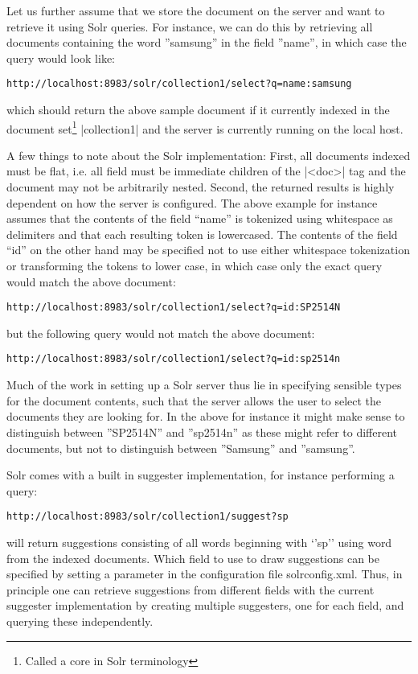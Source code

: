 Let us further assume that we store the document on the server and want to retrieve it using Solr queries. For instance, we can do this by retrieving all documents containing the word ''samsung'' in the field ''name'', in which case the query would look like:

\begin{verbatim}
http://localhost:8983/solr/collection1/select?q=name:samsung
\end{verbatim}

\noindent which should return the above sample document if it currently indexed in the document set\footnote{Called a core in Solr terminology} |collection1| and the server is currently running on the local host.

A few things to note about the Solr implementation: First, all documents indexed must be flat, i.e. all  field must be immediate children of the |<doc>| tag and the document may not be arbitrarily nested. Second, the returned results is highly dependent on how the server is configured. The above example for instance assumes that the contents of the field “name” is tokenized using whitespace as delimiters and that each resulting token is lowercased. The contents of the field “id” on the other hand may be specified not to use either whitespace tokenization or transforming the tokens to lower case, in which case only the exact query would match the above document:

\begin{verbatim}
http://localhost:8983/solr/collection1/select?q=id:SP2514N
\end{verbatim}

\noindent but the following query would not match the above document:

\begin{verbatim}
http://localhost:8983/solr/collection1/select?q=id:sp2514n
\end{verbatim}

Much of the work in setting up a Solr server thus lie in specifying sensible types for the document contents, such that the server allows the user to select the documents they are looking for. In the above for instance it might make sense to distinguish between ''SP2514N'' and ''sp2514n'' as these might refer to different documents, but not to distinguish between ''Samsung'' and ''samsung''.

Solr comes with a built in suggester implementation, for instance performing a query:

\begin{verbatim}
http://localhost:8983/solr/collection1/suggest?sp
\end{verbatim}

\noindent will return suggestions consisting of all words beginning with ‘’sp’’ using word from the indexed documents. Which field to use to draw suggestions can be specified by setting a parameter in the configuration file solrconfig.xml. Thus, in principle one can retrieve suggestions from different fields with the current suggester implementation by creating multiple suggesters, one for each field, and querying these independently.






